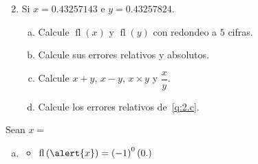 \begin{frame}

	\begin{enumerate}\setcounter{enumi}{1}
		\item

		      Si $x=0.43257143$ e $y=0.43257824$.
		      \begin{multicols}{2}
			      \begin{enumerate}[a)]
				      \item\label{q:2.a}

				      Calcule
				      \begin{math}
					      \operatorname{fl}\left(x\right)
				      \end{math}
				      y
				      \begin{math}
					      \operatorname{fl}\left(y\right)
				      \end{math}
				      con redondeo a $5$ cifras.

				      \item\label{q:2.b}

				      Calcule sus errores relativos y absolutos.

				      \item\label{q:2.c}

				      Calcule $x+y$, $x-y$, $x\times y$ y $\dfrac{x}{y}$.

				      \item\label{q:2.d}

				      Calcule los errores relativos de~\eqref{q:2.c}.
			      \end{enumerate}
		      \end{multicols}
	\end{enumerate}

	\begin{solution}

		Sean
		\begin{math}
			x=
		\end{math}

		\begin{enumerate}[a)]
			\item

			      \begin{multicols}{2}
				      \begin{itemize}
					      \item

					            \begin{math}
						            \operatorname{fl}\left(\alert{x}\right)=
						            \left(-1\right)^{0}
						            \left(
						            0.\right)
					            \end{math}


\end{itemize}
\end{multicols}
\end{enumerate}
\end{solution}
\end{frame}
